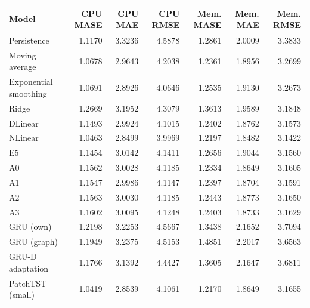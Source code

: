 \begin{tabular}{lrrrrrr}
\toprule
Model & CPU MASE & CPU MAE & CPU RMSE & Mem. MASE & Mem. MAE & Mem. RMSE \\
\midrule
Persistence & 1.1170 & 3.3236 & 4.5878 & 1.2861 & 2.0009 & 3.3833 \\
Moving average & 1.0678 & 2.9643 & 4.2038 & 1.2361 & 1.8956 & 3.2699 \\
Exponential smoothing & 1.0691 & 2.8926 & 4.0646 & 1.2535 & 1.9130 & 3.2673 \\
Ridge & 1.2669 & 3.1952 & 4.3079 & 1.3613 & 1.9589 & 3.1848 \\
DLinear & 1.1493 & 2.9924 & 4.1015 & 1.2402 & 1.8762 & 3.1573 \\
NLinear & 1.0463 & 2.8499 & 3.9969 & 1.2197 & 1.8482 & 3.1422 \\
E5 & 1.1454 & 3.0142 & 4.1411 & 1.2656 & 1.9044 & 3.1560 \\
A0 & 1.1562 & 3.0028 & 4.1185 & 1.2334 & 1.8649 & 3.1605 \\
A1 & 1.1547 & 2.9986 & 4.1147 & 1.2397 & 1.8704 & 3.1591 \\
A2 & 1.1563 & 3.0030 & 4.1185 & 1.2443 & 1.8773 & 3.1650 \\
A3 & 1.1602 & 3.0095 & 4.1248 & 1.2403 & 1.8733 & 3.1629 \\
GRU (own) & 1.2198 & 3.2253 & 4.5667 & 1.3438 & 2.1652 & 3.7094 \\
GRU (graph) & 1.1949 & 3.2375 & 4.5153 & 1.4851 & 2.2017 & 3.6563 \\
GRU-D adaptation & 1.1766 & 3.1392 & 4.4427 & 1.3605 & 2.1647 & 3.6811 \\
PatchTST (small) & 1.0419 & 2.8539 & 4.1061 & 1.2170 & 1.8649 & 3.1655 \\
\bottomrule
\end{tabular}
